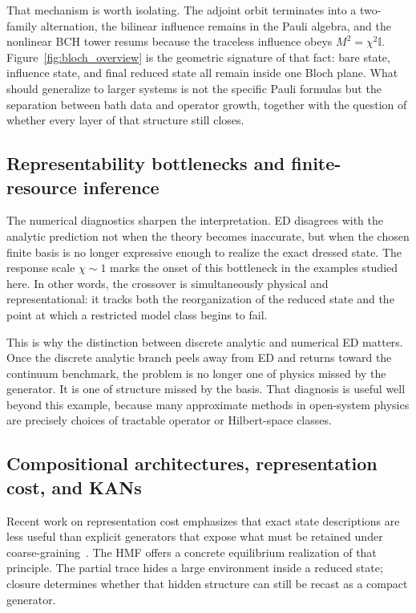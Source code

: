That mechanism is worth isolating. The adjoint orbit terminates into a
two-family alternation, the bilinear influence remains in the Pauli algebra,
and the nonlinear BCH tower resums because the traceless influence obeys
$M^2=\chi^2\mathbb I$. Figure~\ref{fig:bloch_overview} is the geometric
signature of that fact: bare state, influence state, and final reduced state
all remain inside one Bloch plane. What should generalize to larger systems is
not the specific Pauli formulas but the separation between bath data and
operator growth, together with the question of whether every layer of that
structure still closes.

\subsection*{Representability bottlenecks and finite-resource inference}

The numerical diagnostics sharpen the interpretation. ED disagrees with the
analytic prediction not when the theory becomes inaccurate, but when the chosen
finite basis is no longer expressive enough to realize the exact dressed state.
The response scale \(\chi\sim 1\) marks the onset of this bottleneck in the
examples studied here. In other words, the crossover is simultaneously physical
and representational: it tracks both the reorganization of the reduced state
and the point at which a restricted model class begins to fail.

This is why the distinction between discrete analytic and numerical ED matters.
Once the discrete analytic branch peels away from ED and returns toward the
continuum benchmark, the problem is no longer one of physics missed by the
generator. It is one of structure missed by the basis. That diagnosis is useful
well beyond this example, because many approximate methods in open-system
physics are precisely choices of tractable operator or Hilbert-space classes.

\subsection*{Compositional architectures, representation cost, and KANs}

Recent work on representation cost emphasizes that exact state descriptions are
less useful than explicit generators that expose what must be retained under
coarse-graining~\cite{mccaulCostComplexity2026}. The HMF offers a concrete
equilibrium realization of that principle. The partial trace hides a large
environment inside a reduced state; closure determines whether that hidden
structure can still be recast as a compact generator.

